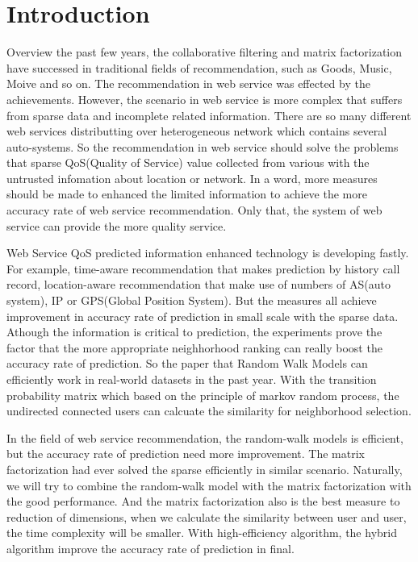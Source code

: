 \documentclass[conference]{IEEEtran}
\begin{document}
\section{Introduction}
\par Overview the past few years, the collaborative filtering and matrix factorization have successed in traditional fields of recommendation, such as Goods, Music, Moive and so on. The recommendation in web service was effected by the achievements. However, the scenario in web service is more complex that suffers from sparse data and incomplete related information. There are so many different web services distributting over heterogeneous network which contains several auto-systems. So the recommendation in web service should solve the problems that sparse QoS(Quality of Service) value collected from various with the untrusted infomation about location or network. In a word, more measures should be made to enhanced the limited information to achieve the more accuracy rate of web service recommendation. Only that, the system of web service can provide the more quality service.
\par Web Service QoS predicted information enhanced technology is developing fastly. For example, time-aware recommendation that makes prediction by history call record, location-aware recommendation that make use of numbers of AS(auto system), IP or GPS(Global Position System). But the measures all achieve improvement in accuracy rate of prediction in small scale with the sparse data. Athough the information is critical to prediction, the experiments prove the factor that the more appropriate neighhorhood ranking can really boost the accuracy rate of prediction. So the paper that Random Walk Models can efficiently work in real-world datasets in the past year. With the transition probability matrix which based on the principle of markov random process, the undirected connected users can calcuate the similarity for neighborhood selection.
\par In the field of web service recommendation, the random-walk models is efficient, but the accuracy rate of prediction need more improvement. The matrix factorization had ever solved the sparse efficiently in similar scenario. Naturally, we will try to combine the random-walk model with the matrix factorization with the good performance. And the matrix factorization also is the best measure to reduction of dimensions, when we calculate the similarity between user and user, the time complexity will be smaller. With high-efficiency algorithm, the hybrid algorithm improve the accuracy rate of prediction in final.
\end{document}
